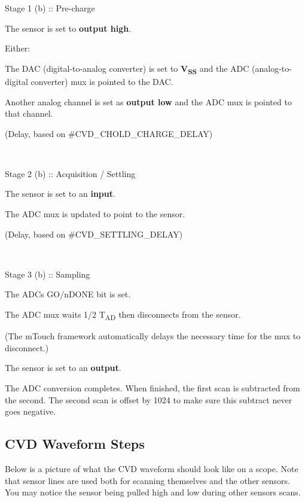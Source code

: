 \begin{DoxyItemize}
\item Stage 1 (b) \+:\+: Pre-\/charge 
\begin{DoxyItemize}
\item The sensor is set to {\bfseries output high}. 
\item Either\+: 
\begin{DoxyItemize}
\item The D\+A\+C (digital-\/to-\/analog converter) is set to {\bfseries V\textsubscript{S\+S}} and the A\+D\+C (analog-\/to-\/digital converter) mux is pointed to the D\+A\+C. 
\item Another analog channel is set as {\bfseries output low} and the A\+D\+C mux is pointed to that channel. 
\end{DoxyItemize}
\item (Delay, based on \#\+C\+V\+D\+\_\+\+C\+H\+O\+L\+D\+\_\+\+C\+H\+A\+R\+G\+E\+\_\+\+D\+E\+L\+A\+Y) 
\end{DoxyItemize}~\newline
~\newline
 
\item Stage 2 (b) \+:\+: Acquisition / Settling 
\begin{DoxyItemize}
\item The sensor is set to an {\bfseries input}. 
\item The A\+D\+C mux is updated to point to the sensor. 
\item (Delay, based on \#\+C\+V\+D\+\_\+\+S\+E\+T\+T\+L\+I\+N\+G\+\_\+\+D\+E\+L\+A\+Y) 
\end{DoxyItemize}~\newline
~\newline
 
\item Stage 3 (b) \+:\+: Sampling 
\begin{DoxyItemize}
\item The A\+D\+C\textquotesingle{}s G\+O/n\+D\+O\+N\+E bit is set. 
\item The A\+D\+C mux waits 1/2 T\textsubscript{A\+D} then disconnects from the sensor. 
\item (The m\+Touch framework automatically delays the necessary time for the mux to disconnect.) 
\item The sensor is set to an {\bfseries output}. 
\end{DoxyItemize}
\end{DoxyItemize}The A\+D\+C conversion completes. When finished, the first scan is subtracted from the second. The second scan is offset by 1024 to make sure this subtract never goes negative.\hypertarget{ts-_waveform_mTouch}{}\subsection{C\+V\+D Waveform Steps}\label{ts-_waveform_mTouch}
Below is a picture of what the C\+V\+D waveform should look like on a scope. Note that sensor lines are used both for scanning themselves and the other sensors. You may notice the sensor being pulled high and low during other sensor\textquotesingle{}s scans.



